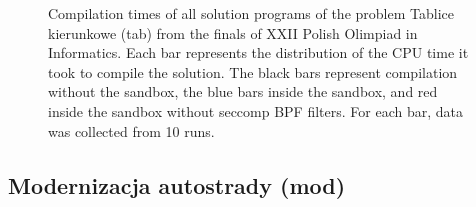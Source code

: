 \documentclass[en]{pracamgr}
\begin{document}
\begin{appendices}
\begin{figure}[H]
\caption{Compilation times of all solution programs of the problem Tablice kierunkowe (tab) from the finals of XXII Polish Olimpiad in Informatics. Each bar represents the distribution of the CPU time it took to compile the solution. The black bars represent compilation without the sandbox, the blue bars inside the sandbox, and red inside the sandbox without seccomp BPF filters. For each bar, data was collected from 10 runs.}
\label{figure:tab_compilation_cpu_time}
\end{figure}

\subsection{Modernizacja autostrady (mod)}


\end{appendices}
\end{document}
